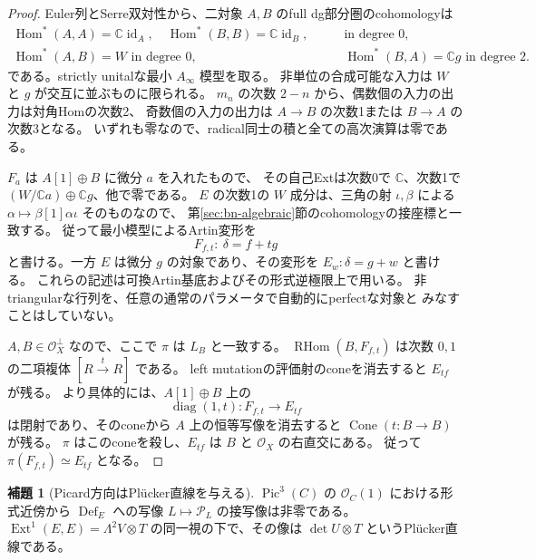 \documentclass[a4paper,11pt]{ltjsarticle}
\theoremstyle{definition}
\newtheorem{lemma}[theorem]{補題}
\newcommand{\CC}{\mathbb C}
\newcommand{\OO}{\mathcal O}
\newcommand{\Def}{\operatorname{Def}}
\newcommand{\Ext}{\operatorname{Ext}}
\newcommand{\Hom}{\operatorname{Hom}}
\newcommand{\RHom}{\operatorname{RHom}}
\newcommand{\id}{\operatorname{id}}
\newcommand{\Pic}{\operatorname{Pic}}
\begin{document}
\begin{proof}
Euler列とSerre双対性から、二対象 $A,B$ のfull dg部分圏のcohomologyは
\[
 \begin{aligned}
 \Hom^*(A,A)=\CC\id_A,\quad \Hom^*(B,B)=\CC\id_B,
 &\qquad\text{in degree }0,\\
 \Hom^*(A,B)=W\text{ in degree }0,
 &\qquad\Hom^*(B,A)=\CC g\text{ in degree }2.
 \end{aligned}
\]
である。strictly unitalな最小 $A_\infty$ 模型を取る。
非単位の合成可能な入力は $W$ と $g$ が交互に並ぶものに限られる。
$m_n$ の次数 $2-n$ から、偶数個の入力の出力は対角Homの次数2、
奇数個の入力の出力は $A\to B$ の次数1または $B\to A$ の次数3となる。
いずれも零なので、radical同士の積と全ての高次演算は零である。

$F_a$ は $A[1]\oplus B$ に微分 $a$ を入れたもので、
その自己Extは次数0で $\CC$、次数1で $(W/\CC a)\oplus\CC g$、他で零である。
$E$ の次数1の $W$ 成分は、三角の射 $\iota,\beta$ による
$\alpha\mapsto\beta[1]\alpha\iota$ そのものなので、
第\ref{sec:bn-algebraic}節のcohomologyの接座標と一致する。
従って最小模型によるArtin変形\cite{ELOI,ELOII}を
\[
 F_{f,t}:\ \delta=f+t g
\]
と書ける。一方 $E$ は微分 $g$ の対象であり、その変形を
$E_w:\delta=g+w$ と書ける。
これらの記述は可換Artin基底およびその形式逆極限上で用いる。
非triangularな行列を、任意の通常のパラメータで自動的にperfectな対象と
みなすことはしていない。

$A,B\in\OO_X^\perp$ なので、ここで $\pi$ は $L_B$ と一致する。
$\RHom(B,F_{f,t})$ は次数 $0,1$ の二項複体 $[R\xrightarrow{t}R]$ である。
left mutationの評価射のconeを消去すると $E_{tf}$ が残る。
より具体的には、$A[1]\oplus B$ 上の
\[
 \operatorname{diag}(1,t):F_{f,t}\longrightarrow E_{tf}
\]
は閉射であり、そのconeから $A$ 上の恒等写像を消去すると
$\operatorname{Cone}(t:B\to B)$ が残る。
$\pi$ はこのconeを殺し、$E_{tf}$ は $B$ と $\OO_X$ の右直交にある。
従って $\pi(F_{f,t})\simeq E_{tf}$ となる。
\end{proof}

\begin{lemma}[Picard方向はPl\"ucker直線を与える]\label{lem:picard-gluing-ks}
$\Pic^3(C)$ の $\OO_C(1)$ における形式近傍から $\Def_E$ への写像
$L\mapsto\mathcal P_L$ の接写像は非零である。
$\Ext^1(E,E)=\Lambda^2V\otimes T$ の同一視の下で、その像は
$\det U\otimes T$ というPl\"ucker直線である。
\end{lemma}
\end{document}
